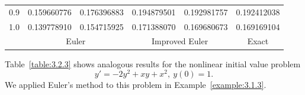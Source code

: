\begin{examplesolution}
\begin{newtable}
\begin{center}
\begin{tabular}{|c|r|r|r|r|r|}
      0.9                       & 0.159660776                   & 0.176396883                         & 0.194879501                   & 0.192981757                    & 0.192412038                 \\
      1.0                       & 0.139778910                   & 0.154715925                         & 0.171388070                   & 0.169680673                    & 0.169169104                 \\
      \hline
                                & \multicolumn{2}{c|}{Euler}    & \multicolumn{2}{c|}{Improved Euler} & \multicolumn{1}{c|}{Exact}     \\
      \hline
    \end{tabular}
  \end{center}
\end{newtable}
\end{examplesolution}

\begin{example}
  \label{example:3.2.3} \rm Table~\ref{table:3.2.3} shows analogous results for the nonlinear
  initial value problem
  \[
    y'=-2y^{2}+xy+x^{2},\ y(0)=1.
  \]
  We applied Euler's method to this problem in Example~\ref{example:3.1.3}.
\end{example}

